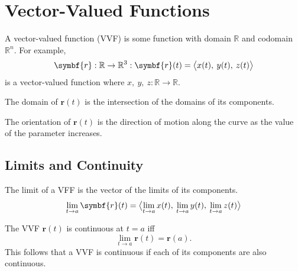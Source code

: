 \documentclass{article}
\begin{document}
\section{Vector-Valued Functions}
\begin{definition}
    A vector-valued function (VVF) is some function
    with domain $\mathbb{R}$ and codomain $\mathbb{R}^n$.
    For example,
    \begin{equation*}
        \symbf{r}:\mathbb{R}\to\mathbb{R}^3
        :\symbf{r}(t)=\avec[\big]{x(t),\: y(t),\: z(t)}
    \end{equation*}
    is a vector-valued function where $x,\:y,\:z: \mathbb{R}\to\mathbb{R}$.
\end{definition}
\begin{theorem}
    The domain of $\symbf{r}(t)$ is the intersection of the domains
    of its components.
\end{theorem}
\begin{definition}[Orientation]
    The orientation of $\symbf{r}(t)$ is the direction of motion along the
    curve as the value of the parameter increases.
\end{definition}
\subsection{Limits and Continuity}
\begin{theorem}
    The limit of a VFF is the vector of the limits of its components.
    \begin{equation*}
        \lim_{t\to a} \symbf{r}(t)
        = \avec[\big]{\lim_{t\to a} x(t),\: \lim_{t\to a} y(t),\: \lim_{t\to a} z(t)}
    \end{equation*}
\end{theorem}
\begin{theorem}
    The VVF $\symbf{r}(t)$ is continuous at $t=a$ iff
    \begin{equation*}
        \lim_{t\to a} \symbf{r}(t) = \symbf{r}(a).
    \end{equation*}
    This follows that a VVF is continuous if each of its components are also continuous.
\end{theorem}
\end{document}
